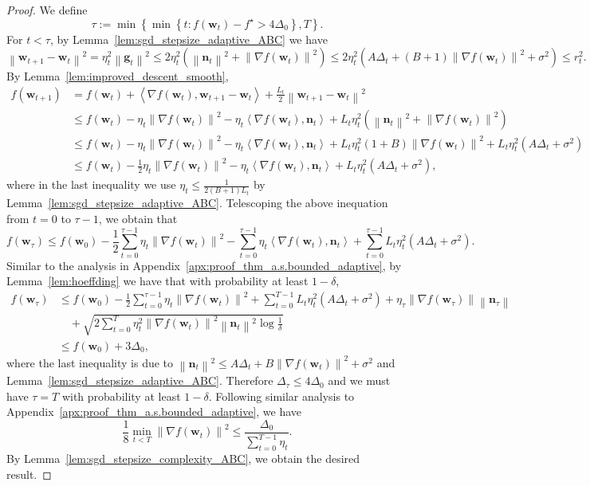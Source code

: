 \documentclass{article}
\newcommand{\Norm}[1]{\left\|#1\right\|}
\newcommand{\dotprod}[2]{\left\langle#1,#2\right\rangle}
\newcommand{\paren}[1]{\left( #1 \right)}
\newcommand{\bw}{\mathbf{w}}
\newcommand{\bn}{\mathbf{n}}
\newcommand{\bg}{\mathbf{g}}
\begin{document}
\begin{proof}
    We define $$\tau:=\min\left\{\min\left\{t:f(\bw_t)-f^\star>4\Delta_0\right\}, T\right\}.$$
    For $t<\tau$, by Lemma~\ref{lem:sgd_stepsize_adaptive_ABC} we have
    $$\Norm{\bw_{t+1}-\bw_t}^2=\eta_t^2\Norm{\bg_t}^2\leq 2\eta_t^2\left(\Norm{\bn_t}^2+\Norm{\nabla f(\bw_t)}^2\right)\leq 2\eta_t^2\paren{A\Delta_t+(B+1)\Norm{\nabla f(\bw_t)}^2+\sigma^2}\leq r_t^2.$$ By Lemma~\ref{lem:improved_descent_smooth}, 
    \begin{align*}
        f(\bw_{t+1})&= f(\bw_t)+\dotprod{\nabla f(\bw_t)}{\bw_{t+1}-\bw_t}+\frac{L_t}{2}\Norm{\bw_{t+1}-\bw_t}^2\\
        &\leq f(\bw_t)-\eta_t\Norm{\nabla f(\bw_t)}^2-\eta_t\dotprod{\nabla f(\bw_t)}{\bn_t}+L_t\eta_t^2\paren{\Norm{\bn_t}^2+\Norm{\nabla f(\bw_t)}^2}
        \\
        &\leq f(\bw_t)-\eta_t\Norm{\nabla f(\bw_t)}^2-\eta_t\dotprod{\nabla f(\bw_t)}{\bn_t}+L_t\eta_t^2\paren{1+B}\Norm{\nabla f(\bw_t)}^2+L_t\eta_t^2\paren{A\Delta_t+\sigma^2}
        \\
        &\leq f(\bw_t)-\frac{1}{2}\eta_t\Norm{\nabla f(\bw_t)}^2-\eta_t\dotprod{\nabla f(\bw_t)}{\bn_t}+L_t\eta_t^2\paren{A\Delta_t+\sigma^2},
    \end{align*}
    where in the last inequality we use $\eta_t\leq\frac{1}{2(B+1)L_t}$ by Lemma~\ref{lem:sgd_stepsize_adaptive_ABC}.
    Telescoping the above inequation from $t=0$ to $\tau-1$, we obtain that
    \begin{equation}\nonumber
        f(\bw_\tau)\leq f(\bw_0)-\frac{1}{2}\sum_{t=0}^{\tau-1}\eta_t\Norm{\nabla f(\bw_t)}^2-\sum_{t=0}^{\tau-1}\eta_t\dotprod{\nabla f(\bw_t)}{\bn_t}+\sum_{t=0}^{\tau-1}L_t\eta_t^2\paren{A\Delta_t+\sigma^2}.
    \end{equation}
    Similar to the analysis in Appendix~\ref{apx:proof_thm_a.s.bounded_adaptive}, by Lemma~\ref{lem:hoeffding} we have that with probability at least $1-\delta$,
    \begin{align*}
        f(\bw_\tau)&\leq f(\bw_0)-\frac{1}{2}\sum_{t=0}^{\tau-1}\eta_t\Norm{\nabla f(\bw_t)}^2+\sum_{t=0}^{T-1}L_t\eta_t^2\paren{A\Delta_t+\sigma^2}
        +\eta_\tau\Norm{\nabla f(\bw_\tau)}\Norm{\bn_\tau}\\
        &\quad+\sqrt{2\sum_{t=0}^T\eta_t^2\Norm{\nabla f(\bw_t)}^2\Norm{\bn_t}^2\log\frac{1}{\delta}}\\
        &\leq f(\bw_0)+3\Delta_0,
    \end{align*}
     where the last inequality is due to $\Norm{\bn_t}^2\leq A\Delta_t+B\Norm{\nabla f(\bw_t)}^2+\sigma^2$ and 
     Lemma~\ref{lem:sgd_stepsize_adaptive_ABC}.
    Therefore $\Delta_\tau\leq 4\Delta_0$ and we must have $\tau=T$ with probability at least $1-\delta$. Following similar analysis to Appendix~\ref{apx:proof_thm_a.s.bounded_adaptive}, we have
    $$\frac{1}{8}\min_{t<T}\Norm{\nabla f(\bw_t)}^2\leq \frac{\Delta_0}{\sum_{t=0}^{T-1}\eta_t}.$$
    By Lemma~\ref{lem:sgd_stepsize_complexity_ABC}, we obtain the desired result.
\end{proof}
\end{document}
